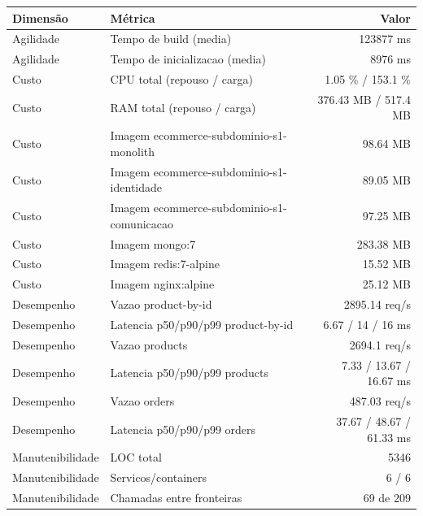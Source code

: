 \begin{quadro}[htb]
  \centering
  \caption{Métricas (ecommerce, subdominio, snapshot-1).}
  \label{qua:metricas-ecommerce-subdominio-snapshot-1}
  \renewcommand{\arraystretch}{1.15}
  \begin{tabular}{|l|l|r|}
    \hline
    \textbf{Dimensão} & \textbf{Métrica} & \textbf{Valor} \\
    \hline
    Agilidade & Tempo de build (media) & 123877 ms \\ \hline
    Agilidade & Tempo de inicializacao (media) & 8976 ms \\ \hline
    Custo & CPU total (repouso / carga) & 1.05 \% / 153.1 \% \\ \hline
    Custo & RAM total (repouso / carga) & 376.43 MB / 517.4 MB \\ \hline
    Custo & Imagem ecommerce-subdominio-s1-monolith & 98.64 MB \\ \hline
    Custo & Imagem ecommerce-subdominio-s1-identidade & 89.05 MB \\ \hline
    Custo & Imagem ecommerce-subdominio-s1-comunicacao & 97.25 MB \\ \hline
    Custo & Imagem mongo:7 & 283.38 MB \\ \hline
    Custo & Imagem redis:7-alpine & 15.52 MB \\ \hline
    Custo & Imagem nginx:alpine & 25.12 MB \\ \hline
    Desempenho & Vazao product-by-id & 2895.14 req/s \\ \hline
    Desempenho & Latencia p50/p90/p99 product-by-id & 6.67 / 14 / 16 ms \\ \hline
    Desempenho & Vazao products & 2694.1 req/s \\ \hline
    Desempenho & Latencia p50/p90/p99 products & 7.33 / 13.67 / 16.67 ms \\ \hline
    Desempenho & Vazao orders & 487.03 req/s \\ \hline
    Desempenho & Latencia p50/p90/p99 orders & 37.67 / 48.67 / 61.33 ms \\ \hline
    Manutenibilidade & LOC total & 5346 \\ \hline
    Manutenibilidade & Servicos/containers & 6 / 6 \\ \hline
    Manutenibilidade & Chamadas entre fronteiras & 69 de 209 \\ \hline
  \end{tabular}
\end{quadro}
